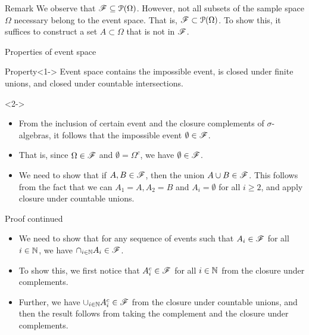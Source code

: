 \documentclass[12pt,aspectratio=169]{beamer}
\begin{document}
\begin{frame}
    \begin{block}{Remark}
        We observe that $\mathscr{F} \subseteq \mathcal{P}(\Omega)$. 
        However, not all subsets of the sample space $\Omega$ necessary belong to the event space. 
        That is, $\mathscr{F} \subset \mathcal{P}(\Omega)$. 
        To show this, it suffices to construct a set $A \subset \Omega$ that is not in $\mathscr{F}$. 
    \end{block}
\end{frame}

\begin{frame}{Properties of event space}
    \begin{block}{Property}<1->
        Event space contains the impossible event, is closed under finite unions, and closed under countable intersections.
    \end{block}
    \begin{Proof}<2->
        \begin{itemize}
            \item<2-> From the inclusion of certain event and the closure complements of $\sigma$-algebras, it follows that the impossible event $\emptyset \in \mathscr{F}$. 
            
            \item<2-> That is, since $\Omega \in \mathscr{F}$ and $\emptyset = \Omega^c$, we have $\emptyset \in \mathscr{F}$.
            
            \item<3-> We need to show that if $A,B \in \mathscr{F}$, then the union $A\cup B \in \mathscr{F}$. This follows from the fact that we can $A_1 = A, A_2 = B$ and $A_i = \emptyset$ for all $i \ge 2$, and apply closure under countable unions. 
        \end{itemize}
    \end{Proof}
\end{frame}

\begin{frame}{Proof continued}
    \begin{Proof}
        \begin{itemize}
            \item<1-> We need to show that for any sequence of events such that $A_i \in \mathscr{F}$ for all $i \in \mathbb{N}$, we have $\cap_{i \in \mathbb{N}}A_i \in \mathscr{F}$. 
        
            \item<2-> To show this, we first notice that $A_i^c \in \mathscr{F}$ for all $i \in \mathbb{N}$ from the closure under complements. 
        
            \item<3-> Further, we have $\cup_{i \in \mathbb{N}}A_i^c \in \mathscr{F}$ from the closure under countable unions, and then the result follows from taking the complement and the closure under complements. 
        \end{itemize}
    \end{Proof}
\end{frame}
    
\end{document}
